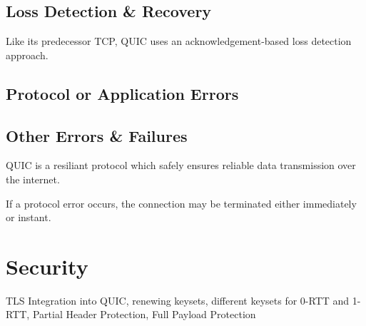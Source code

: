 \subsection{Loss Detection \& Recovery}

Like its predecessor TCP, QUIC uses an acknowledgement-based loss detection approach.

\subsection{Protocol or Application Errors}

\subsection{Other Errors \& Failures}

QUIC is a resiliant protocol which safely ensures reliable data transmission over the internet.

If a protocol error occurs, the connection may be terminated either immediately or instant.

\section{Security} \label{security}

TLS Integration into QUIC, renewing keysets, different keysets for 0-RTT and 1-RTT, Partial Header Protection, Full Payload Protection